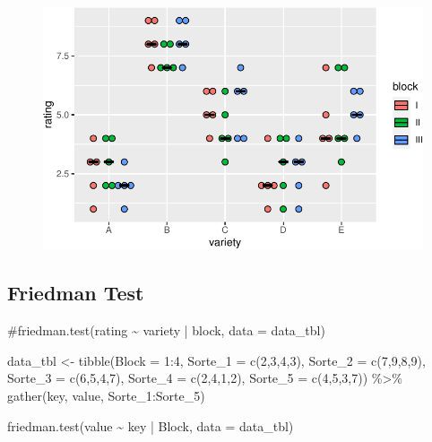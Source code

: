 \documentclass[
  letterpaper,
]{scrbook}
\newenvironment{Shaded}{\begin{snugshade}}{\end{snugshade}}
\newcommand{\AttributeTok}[1]{\textcolor[rgb]{0.40,0.45,0.13}{#1}}
\newcommand{\CommentTok}[1]{\textcolor[rgb]{0.37,0.37,0.37}{#1}}
\newcommand{\DecValTok}[1]{\textcolor[rgb]{0.68,0.00,0.00}{#1}}
\newcommand{\FunctionTok}[1]{\textcolor[rgb]{0.28,0.35,0.67}{#1}}
\newcommand{\NormalTok}[1]{\textcolor[rgb]{0.00,0.23,0.31}{#1}}
\newcommand{\OtherTok}[1]{\textcolor[rgb]{0.00,0.23,0.31}{#1}}
\newcommand{\SpecialCharTok}[1]{\textcolor[rgb]{0.37,0.37,0.37}{#1}}
\begin{document}
\begin{figure}[H]

{\centering \includegraphics{./app-example-analysis_files/figure-pdf/unnamed-chunk-14-1.pdf}

}

\end{figure}

\hypertarget{friedman-test}{%
\subsection{Friedman Test}\label{friedman-test}}

\begin{Shaded}
\begin{Highlighting}[]
\CommentTok{\#friedman.test(rating \textasciitilde{} variety | block, data = data\_tbl)}

\NormalTok{data\_tbl }\OtherTok{\textless{}{-}} \FunctionTok{tibble}\NormalTok{(}\AttributeTok{Block =} \DecValTok{1}\SpecialCharTok{:}\DecValTok{4}\NormalTok{,}
                   \AttributeTok{Sorte\_1 =} \FunctionTok{c}\NormalTok{(}\DecValTok{2}\NormalTok{,}\DecValTok{3}\NormalTok{,}\DecValTok{4}\NormalTok{,}\DecValTok{3}\NormalTok{),}
                   \AttributeTok{Sorte\_2 =} \FunctionTok{c}\NormalTok{(}\DecValTok{7}\NormalTok{,}\DecValTok{9}\NormalTok{,}\DecValTok{8}\NormalTok{,}\DecValTok{9}\NormalTok{),}
                   \AttributeTok{Sorte\_3 =} \FunctionTok{c}\NormalTok{(}\DecValTok{6}\NormalTok{,}\DecValTok{5}\NormalTok{,}\DecValTok{4}\NormalTok{,}\DecValTok{7}\NormalTok{),}
                   \AttributeTok{Sorte\_4 =} \FunctionTok{c}\NormalTok{(}\DecValTok{2}\NormalTok{,}\DecValTok{4}\NormalTok{,}\DecValTok{1}\NormalTok{,}\DecValTok{2}\NormalTok{),}
                   \AttributeTok{Sorte\_5 =} \FunctionTok{c}\NormalTok{(}\DecValTok{4}\NormalTok{,}\DecValTok{5}\NormalTok{,}\DecValTok{3}\NormalTok{,}\DecValTok{7}\NormalTok{)) }\SpecialCharTok{\%\textgreater{}\%}
  \FunctionTok{gather}\NormalTok{(key, value, Sorte\_1}\SpecialCharTok{:}\NormalTok{Sorte\_5)}

\FunctionTok{friedman.test}\NormalTok{(value }\SpecialCharTok{\textasciitilde{}}\NormalTok{ key }\SpecialCharTok{|}\NormalTok{ Block, }\AttributeTok{data =}\NormalTok{ data\_tbl)}
\end{Highlighting}
\end{Shaded}
\end{document}

